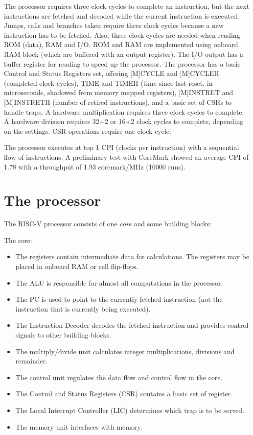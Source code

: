 \documentclass[12pt]{article}
\begin{document}
The processor requires three clock cycles to complete an instruction, but the next instructions are fetched and decoded while the current instruction is executed. Jumps, calls and branches taken require three clock cycles because a new instruction has to be fetched. Also, three clock cycles are needed when reading ROM (data), RAM and I/O. ROM and RAM are implemented using onboard RAM block (which are buffered with an output register). The I/O output has a buffer register for reading to speed up the processor. The processor has a basic Control and Status Registers set, offering [M]CYCLE and [M]CYCLEH (completed clock cycles), TIME and TIMEH (time since last reset, in microseconds, shadowed from memory mapped registers), [M]INSTRET and [M]INSTRETH (number of retired instructions), and a basic set of CSRs to handle traps. A hardware multiplication requires three clock cycles to complete. A hardware division requires 32+2 or 16+2 clock cycles to complete, depending on the settings. CSR operations require one clock cycle.

The processor executes at top 1 CPI (clocks per instruction) with a sequential flow of instructions. A preliminary test with CoreMark showed an average CPI of 1.78 with a throughput of 1.93 coremark/MHz (16000 runs).

\section{The processor}
The RISC-V processor consists of one \textit{core} and some building blocks:

The core:
\begin{itemize}
\item The registers contain intermediate data for calculations. The registers may be placed in onboard RAM or cell flip-flops.
\item The ALU is responsible for almost all computations in the processor.
\item The PC is used to point to the currently fetched instruction (not the instruction that is currently being executed).
\item The Instruction Decoder decodes the fetched instruction and provides control signals to other building blocks.
\item The multiply/divide unit calculates integer multiplications, divisions and remainder.
\item The control unit regulates the data flow and control flow in the core.
\item The Control and Status Registers (CSR) contains a basic set of register.
\item The Local Interrupt Controller (LIC) determines which trap is to be served.
\item The memory unit interfaces with memory.
\end{itemize}
\end{document}
